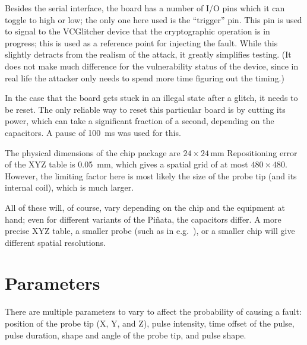 \documentclass[times, utf8, diplomski]{fer}
\begin{document}

Besides the serial interface, the board has a number of I/O pins which it can
toggle to high or low; the only one here used is the ``trigger'' pin. This pin is
used to signal to the VCGlitcher device that the cryptographic operation is in
progress; this is used as a reference point for injecting the fault. While this
slightly detracts from the realism of the attack, it greatly simplifies testing.
(It does not make much difference for the vulnerability status of the device,
since in real life the attacker only needs to spend more time figuring out the
timing.)

In the case that the board gets stuck in an illegal state after a glitch, it
needs to be reset. The only reliable way to reset this particular board is by
cutting its power, which can take a significant fraction of a second, depending
on the capacitors. A pause of \SI{100}{\milli\second} was used for this.

The physical dimensions of the chip package are $24 \times 24$\,\si{\milli\metre}
Repositioning error of the XYZ table is \SI{0.05}{\milli\metre}, which gives
a spatial grid of at most $480 \times 480$. However, the limiting factor here
is most likely the size of the probe tip (and its internal coil), which is much
larger.

All of these will, of course, vary depending on the chip and the equipment at
hand; even for different variants of the Piñata, the capacitors differ.
A more precise XYZ table, a smaller probe (such as in e.g.~\cite{ordas2015injection}),
or a smaller chip will give different spatial resolutions.


\section{Parameters}\label{sec:parameters}
There are multiple parameters to vary to affect the probability of causing a
fault: position of the probe tip (X, Y, and Z), pulse intensity, time offset
of the pulse, pulse duration, shape and angle of the probe tip, and pulse shape.
\end{document}
